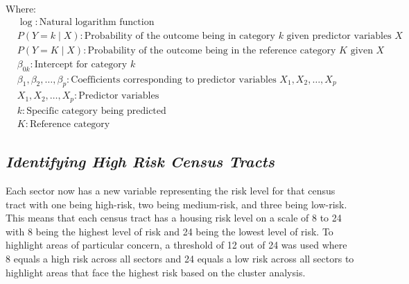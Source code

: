Where:
\begin{align*}
    & \log: \text{Natural logarithm function} \\
    & P(Y = k \mid X): \text{Probability of the outcome being in category \(k\) given predictor variables \(X\)} \\
    & P(Y = K \mid X): \text{Probability of the outcome being in the reference category \(K\) given \(X\)} \\
    & \beta_{0k}: \text{Intercept for category \(k\)} \\
    & \beta_1, \beta_2, \dots, \beta_p: \text{Coefficients corresponding to predictor variables \(X_1, X_2, \dots, X_p\)} \\
    & X_1, X_2, \dots, X_p: \text{Predictor variables} \\
    & k: \text{Specific category being predicted} \\
    & K: \text{Reference category}
\end{align*}

\subsection{\textit{Identifying High Risk Census Tracts}}
Each sector now has a new variable representing the risk level for that census tract with one being high-risk, two being medium-risk, and three being low-risk. This means that each census tract has a housing risk level on a scale of 8 to 24 with 8 being the highest level of risk and 24 being the lowest level of risk. To highlight areas of particular concern, a threshold of 12 out of 24 was used where 8 equals a high risk across all sectors and 24 equals a low risk across all sectors to highlight areas that face the highest risk based on the cluster analysis.

\endinput